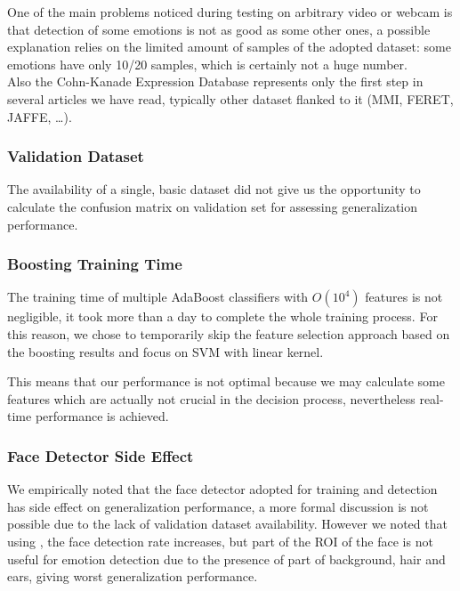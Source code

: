 One of the main problems noticed during testing on arbitrary video or webcam is that detection of some emotions is not as good as some other ones, a possible explanation relies on the limited amount of samples of the adopted dataset: some emotions have only 10/20 samples, which is certainly not a huge number.\\
Also the Cohn-Kanade Expression Database represents only the first step in several articles we have read, typically other dataset flanked to it (MMI, FERET, JAFFE, \ldots).

\subsubsection*{Validation Dataset}

The availability of a single, basic dataset did not give us the opportunity to calculate the confusion matrix on validation set for assessing generalization performance.

\subsubsection*{Boosting Training Time}

The training time of multiple AdaBoost classifiers with $O(10^4)$ features is not negligible, it took more than a day to complete the whole training process. For this reason, we chose to temporarily skip the feature selection approach based on the boosting results and focus on SVM with linear kernel.

This means that our performance is not optimal because we may calculate some features which are actually not crucial in the decision process, nevertheless real-time performance is achieved.

\subsubsection*{Face Detector Side Effect}

We empirically noted that the face detector adopted for training and detection has side effect on generalization performance, a more formal discussion is not possible due to the lack of validation dataset availability. However we noted that using , the face detection rate increases, but part of the ROI of the face is not useful for emotion detection due to the presence of part of background, hair and ears, giving worst generalization performance.

